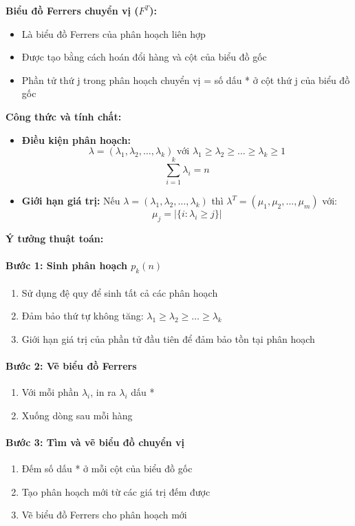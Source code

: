\documentclass[12pt,a4paper]{article}
\begin{document}
\textbf{Biểu đồ Ferrers chuyển vị ($F^T$):} 
\begin{itemize}[label=\textbullet]
    \item Là biểu đồ Ferrers của phân hoạch liên hợp
    \item Được tạo bằng cách hoán đổi hàng và cột của biểu đồ gốc
    \item Phần tử thứ j trong phân hoạch chuyển vị = số dấu * ở cột thứ j của biểu đồ gốc
\end{itemize}

\textbf{Công thức và tính chất:} 
\begin{itemize}[label=\textbullet]
    \item \textbf{Điều kiện phân hoạch:}
$$\lambda = (\lambda_1, \lambda_2, \ldots, \lambda_k) \text{ với } \lambda_1 \geq \lambda_2 \geq \ldots \geq \lambda_k \geq 1$$
$$\sum_{i=1}^{k} \lambda_i = n$$
    \item \textbf{Giới hạn giá trị:} Nếu $\lambda = (\lambda_1, \lambda_2, \ldots, \lambda_k)$ thì $\lambda^T = (\mu_1, \mu_2, \ldots, \mu_m)$ với:
$$\mu_j = |\{i : \lambda_i \geq j\}|$$
\end{itemize}

\textbf{Ý tưởng thuật toán:} 
\paragraph{Bước 1: Sinh phân hoạch $p_k(n)$}
\begin{enumerate}
    \item Sử dụng đệ quy để sinh tất cả các phân hoạch
    \item Đảm bảo thứ tự không tăng: $\lambda_1 \geq \lambda_2 \geq \ldots \geq \lambda_k$
    \item Giới hạn giá trị của phần tử đầu tiên để đảm bảo tồn tại phân hoạch
\end{enumerate}

\paragraph{Bước 2: Vẽ biểu đồ Ferrers}
\begin{enumerate}
    \item Với mỗi phần $\lambda_i$, in ra $\lambda_i$ dấu *
    \item Xuống dòng sau mỗi hàng
\end{enumerate}

\paragraph{Bước 3: Tìm và vẽ biểu đồ chuyển vị}
\begin{enumerate}
    \item Đếm số dấu * ở mỗi cột của biểu đồ gốc
    \item Tạo phân hoạch mới từ các giá trị đếm được
    \item Vẽ biểu đồ Ferrers cho phân hoạch mới
\end{enumerate}
\end{document}
